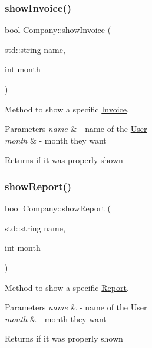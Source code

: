 \subsubsection{\texorpdfstring{show\+Invoice()}{showInvoice()}}
{\footnotesize\ttfamily bool Company\+::show\+Invoice (\begin{DoxyParamCaption}\item[{std\+::string}]{name,  }\item[{int}]{month }\end{DoxyParamCaption})}



Method to show a specific \mbox{\hyperlink{class_invoice}{Invoice}}. 


\begin{DoxyParams}{Parameters}
{\em name} & -\/ name of the \mbox{\hyperlink{class_user}{User}} \\
\hline
{\em month} & -\/ month they want \\
\hline
\end{DoxyParams}
\begin{DoxyReturn}{Returns}
if it was properly shown 
\end{DoxyReturn}
\mbox{\label{class_company_a2c00c88b245aef0e0e52864b585f8f6b}} 
\subsubsection{\texorpdfstring{show\+Report()}{showReport()}}
{\footnotesize\ttfamily bool Company\+::show\+Report (\begin{DoxyParamCaption}\item[{std\+::string}]{name,  }\item[{int}]{month }\end{DoxyParamCaption})}



Method to show a specific \mbox{\hyperlink{class_report}{Report}}. 


\begin{DoxyParams}{Parameters}
{\em name} & -\/ name of the \mbox{\hyperlink{class_user}{User}} \\
\hline
{\em month} & -\/ month they want \\
\hline
\end{DoxyParams}
\begin{DoxyReturn}{Returns}
if it was properly shown 
\end{DoxyReturn}
\mbox{\label{class_company_aa64ff74648761cfe39d4a9fb0c72031f}} 

